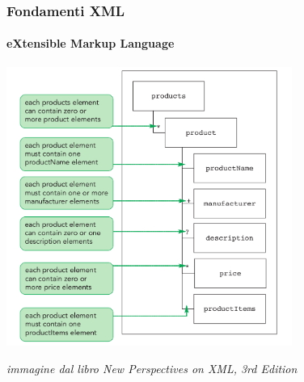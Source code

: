 



    


\begin{frame}
	\frametitle{Fondamenti XML}
	\framesubtitle{eXtensible Markup Language}
	\addtocounter{nframe}{1}

	\begin{center}
		
		\includegraphics[width=0.7\textwidth]{imgs/xml-parent-child-quantifier2.png}
	\end{center}
\begin{tiny}\textit{immagine dal libro New Perspectives on XML, 3rd Edition}\end{tiny}
\end{frame}


